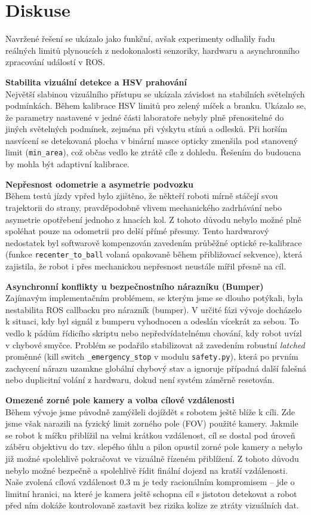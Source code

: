 \documentclass[a4paper,11pt]{article}
\begin{document}
\section{Diskuse}
Navržené řešení se ukázalo jako funkční, avšak experimenty odhalily řadu reálných limitů plynoucích z nedokonalosti senzoriky, hardwaru a asynchronního zpracování událostí v ROS.

\textbf{Stabilita vizuální detekce a HSV prahování} \\
Největší slabinou vizuálního přístupu se ukázala závislost na stabilních světelných podmínkách. Během kalibrace HSV limitů pro zelený míček a branku. Ukázalo se, že parametry nastavené v jedné části laboratoře nebyly plně přenositelné do jiných světelných podmínek, zejména při výskytu stínů a odlesků. Při horším nasvícení se detekovaná plocha v binární masce opticky zmenšila pod stanovený limit (\texttt{min\_area}), což občas vedlo ke ztrátě cíle z dohledu. Řešením do budoucna by mohla být adaptivní kalibrace.

\textbf{Nepřesnost odometrie a asymetrie podvozku} \\
Během testů jízdy vpřed bylo zjištěno, že někteří roboti mírně stáčejí svou trajektorii do strany, pravděpodobně vlivem mechanického zadrhávání nebo asymetrie opotřebení jednoho z hnacích kol. Z tohoto důvodu nebylo možné plně spoléhat pouze na odometrii pro delší přímé přesuny. Tento hardwarový nedostatek byl softwarově kompenzován zavedením průběžné optické re-kalibrace (funkce \texttt{recenter\_to\_ball} volaná opakovaně během přibližovací sekvence), která zajistila, že robot i přes mechanickou nepřesnost neustále mířil přesně na cíl.

\textbf{Asynchronní konflikty u bezpečnostního nárazníku (Bumper)} \\
Zajímavým implementačním problémem, se kterým jsme se dlouho potýkali, byla nestabilita ROS callbacku pro nárazník (bumper). V určité fázi vývoje docházelo k situaci, kdy byl signál z bumperu vyhodnocen a odeslán vícekrát za sebou. To vedlo k pádům řídicího skriptu nebo nepředvídatelnému chování, kdy robot uvízl v chybové smyčce. Problém se podařilo stabilizovat až zavedením robustní \textit{latched} proměnné (kill switch \texttt{\_emergency\_stop} v modulu \texttt{safety.py}), která po prvním zachycení nárazu uzamkne globální chybový stav a ignoruje případná další falešná nebo duplicitní volání z hardwaru, dokud není systém záměrně resetován.

\textbf{Omezené zorné pole kamery a volba cílové vzdálenosti} \\
Během vývoje jsme původně zamýšleli dojíždět s robotem ještě blíže k cíli. Zde jsme však narazili na fyzický limit zorného pole (FOV) použité kamery. Jakmile se robot k míčku přiblížil na velmi krátkou vzdálenost, cíl se dostal pod úroveň záběru objektivu do tzv. slepého úhlu a pilon opustil zorné pole kamery a nebylo již možné spolehlivě pokračovat ve vizuálně řízeném přiblížení. Z tohoto důvodu nebylo možné bezpečně a spolehlivě řídit finální dojezd na kratší vzdálenosti. Naše zvolená cílová vzdálenost 0.3 m je tedy racionálním kompromisem -- jde o limitní hranici, na které je kamera ještě schopna cíl s jistotou detekovat a robot před ním dokáže kontrolovaně zastavit bez rizika kolize ze ztráty vizuálních dat.
\end{document}
